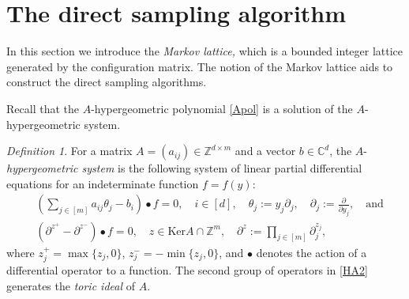 \documentclass[a4paper,12pt]{article}
\theoremstyle{plain}
\theoremstyle{remark}
\newtheorem{definition}[theorem]{Definition}
\begin{document}
\section{The direct sampling algorithm}
\label{sect:lattice}

In this section we introduce the {\it Markov lattice,} which
is a bounded integer lattice generated by the configuration
matrix. The notion of the Markov lattice aids to construct
the direct sampling algorithms.

Recall that the $A$-hypergeometric polynomial \eqref{Apol}
is a solution of the $A$-hypergeometric system.

\begin{definition}
  For a matrix $A=(a_{ij})\in \mathbb{Z}^{d\times m}$ and
  a vector $b\in\mathbb{C}^d$, the
  $A$-{\it hypergeometric system} is the following system of
  linear partial differential equations for an indeterminate
  function $f=f(y)$:
  \begin{align}
    &(\sum_{j\in[m]}a_{ij}\theta_j-b_i)\bullet f=0,
    \quad  i\in[d], \quad
    \theta_j:=y_j\partial_j, \quad
    \partial_j:=\frac{\partial}{\partial y_j}, \quad
    \text{and}
    \label{HA1}\\
    &(\partial^{z^+}-\partial^{z^-})\bullet f=0,\quad
    z\in\text{Ker} A\cap {\mathbb{Z}}^m, \quad
    \partial^{z}:=\prod_{j\in[m]}\partial_j^{z_j},
    \label{HA2}
  \end{align}
  where $z^+_j=\max\{z_j,0\}$, $z^-_j=-\min\{z_j,0\}$,
  and $\bullet$ denotes the action of a differential operator
  to a function.
  The second group of operators in \eqref{HA2} generates
  the {\it toric ideal} of $A$.
\end{definition}
\end{document}
